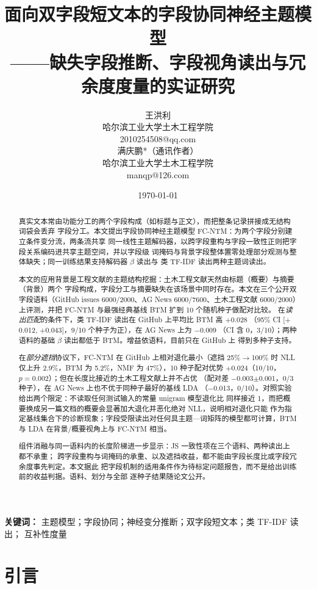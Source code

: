 \documentclass{article}
\title{\bfseries 面向双字段短文本的字段协同神经主题模型\\[4pt]
       \large ——缺失字段推断、字段视角读出与冗余度度量的实证研究}
\author{王洪利\\[2pt]{\small 哈尔滨工业大学土木工程学院}\\[1pt]{\small 2010254508@qq.com}\\[8pt]
        满庆鹏*（通讯作者）\\[2pt]{\small 哈尔滨工业大学土木工程学院}\\[1pt]{\small manqp@126.com}}
\date{\today}
\begin{document}
\maketitle

\begin{abstract}
真实文本常由功能分工的两个字段构成（如标题与正文），而把整条记录拼接成无结构词袋会丢弃
字段分工。本文提出字段协同神经主题模型 FC-NTM：为两个字段分别建立条件变分流，两条流共享
同一线性主题解码器，以跨字段重构与字段一致性正则把字段关系编码进共享主题空间，并以字段级
词掩码与背景字段整体置零处理部分观测与整体缺失；同一训练结果支持解码器 $\beta$ 读出与
类 TF-IDF 读出两种主题词读出。

本文的应用背景是工程文献的主题结构挖掘：土木工程文献天然由标题（概要）与摘要（背景）两个
字段构成，字段分工与摘要缺失在该场景中同时存在。本文在三个公开双字段语料（GitHub issues 6000/2000、AG News 6000/7600、土木工程文献
6000/2000）上评测，并把 FC-NTM 与最强经典基线 BTM 扩到 10 个随机种子做配对比较。
在\emph{读出匹配}的条件下，类 TF-IDF 读出在 GitHub 上平均比 BTM 高 $+$0.028
（95\% CI [$+$0.012, $+$0.043]，9/10 个种子为正），在 AG News 上为 $-$0.009
（CI 含 0，3/10）；两种语料的基础 $\beta$ 读出都低于 BTM。增益依语料，目前只在 GitHub 上
得到多种子支持。

在\emph{部分遮挡}协议下，FC-NTM 在 GitHub 上相对退化最小（遮挡
25\%$\rightarrow$100\% 时 NLL 仅上升 2.9\%，BTM 为 5.2\%，NMF 为 47\%），10 种子配对优势
$+$0.024（10/10，$p=0.002$）；但在长度比接近的土木工程文献上并不占优
（配对差 $-$0.003$\pm$0.001，0/3 种子），在 AG News 上也不优于同种子最好的基线 LDA
（$-$0.013，0/10）。对照实验给出两个限定：不读取任何测试输入的常量 unigram 模型退化比
同样接近 1，而把概要换成另一篇文档的概要会显著加大退化并恶化绝对 NLL，说明相对退化只能
作为指定基线集合下的诊断现象；字段受限读出对任何具主题—词矩阵的模型都可计算，BTM 与 LDA
在背景/概要视角上与 FC-NTM 相当。

组件消融与同一语料内的长度阶梯进一步显示：JS 一致性项在三个语料、两种读出上都不承重；
跨字段重构与词掩码的承重、以及遮挡收益，都不能由字段长度比或字段冗余度事先判定。本文据此
把字段机制的适用条件作为待标定问题报告，而不是给出训练前的收益判据。语料、划分与全部
逐种子结果随论文公开。
\end{abstract}

\noindent\textbf{关键词：} 主题模型；字段协同；神经变分推断；双字段短文本；类 TF-IDF 读出；
互补性度量

\section{引言}
\end{document}
